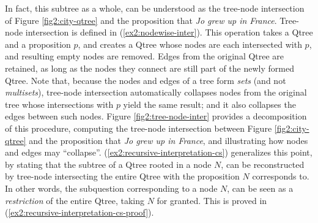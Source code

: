In fact, this subtree as a whole, can be understood as the tree-node intersection of Figure \ref{fig2:city-qtree} and the proposition that \textit{Jo grew up in France}. Tree-node intersection is defined in (\ref{ex2:nodewise-inter}). This operation takes a Qtree and a proposition $p$, and creates a Qtree whose nodes are each intersected with $p$, and resulting empty nodes are removed. Edges from the original Qtree are retained, as long as the nodes they connect are still part of the newly formed Qtree. Note that, because the nodes and edges of a tree form \textit{sets} (and not \textit{multisets}), tree-node intersection automatically collapses nodes from the original tree whose intersections with $p$ yield the same result; and it also collapses the edges between such nodes. Figure \ref{fig2:tree-node-inter} provides a decomposition of this procedure, computing the tree-node intersection between Figure \ref{fig2:city-qtree} and the proposition that \textit{Jo grew up in France}, and illustrating how nodes and edges may ``collapse''. (\ref{ex2:recursive-interpretation-cs}) generalizes this point, by stating that the subtree of a Qtree rooted in a node $N$, can be reconstructed by tree-node intersecting the entire Qtree with the proposition $N$ corresponds to. In other words, the subquestion corresponding to a node $N$, can be seen as a \textit{restriction} of the entire Qtree, taking $N$ for granted. This is proved in (\ref{ex2:recursive-interpretation-cs-proof}).

\begin{exe}
	\label{ex2:nodewise-inter}
\end{exe}

